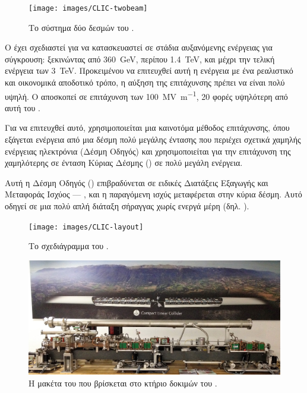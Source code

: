 \begin{figure}[tph]
\texttt{[image: images/CLIC-twobeam]}
\centering
\caption{Το σύστημα δύο δεσμών του .}
\label{img:CLICtwobeamscheme}
\end{figure}

Ο  έχει σχεδιαστεί για να κατασκευαστεί σε στάδια αυξανόμενης ενέργειας για σύγκρουση: ξεκινώντας από \SI{360}{\giga \electronvolt}, περίπου \SI{1.4}{\TeV}, και μέχρι την τελική ενέργεια των \SI{3}{\TeV}. 
Προκειμένου να επιτευχθεί αυτή η ενέργεια με ένα ρεαλιστικό και οικονομικά αποδοτικό τρόπο, η αύξηση της επιτάχυνσης πρέπει να είναι πολύ υψηλή.
Ο  αποσκοπεί σε επιτάχυνση των \SI[per-mode = symbol]{100}{\mega \volt \per \metre}, 20 φορές υψηλότερη από αυτή του .

Για να επιτευχθεί αυτό, χρησιμοποιείται μια καινοτόμα μέθοδος επιτάχυνσης, όπου εξάγεται ενέργεια από μια δέσμη πολύ μεγάλης έντασης που περιέχει σχετικά χαμηλής ενέργειας ηλεκτρόνια (Δέσμη Οδηγός) και χρησιμοποιείται για την επιτάχυνση της χαμηλότερης σε ένταση Κύριας Δέσμης () σε πολύ μεγάλη ενέργεια.

Αυτή η Δέσμη Οδηγός () επιβραδύνεται σε ειδικές Διατάξεις Εξαγωγής και Μεταφοράς Ισχύος --- , και η παραγόμενη  ισχύς μεταφέρεται στην κύρια δέσμη. 
Αυτό οδηγεί σε μια πολύ απλή διάταξη σήραγγας χωρίς ενεργά  μέρη (δηλ. ).

\begin{figure}[tph]
\texttt{[image: images/CLIC-layout]}
\centering
\caption{Το σχεδιάγραμμα του .}
\label{img:CLIC-layout}
\end{figure}

\begin{figure}[tph]
\includegraphics[width=\linewidth]{images/CLIC-maquette}
\centering
\caption[Η μακέτα του .]
{Η μακέτα του  που βρίσκεται στο κτήριο δοκιμών  του .}
\label{img:CLIC-maquette}
\end{figure}

